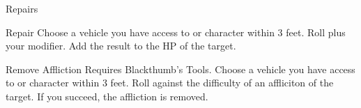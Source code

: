 \begin{abstractsection}{Repairs}
\vspace{1ex}

\begin{describe}{Repair}
  Choose a vehicle you have access to or character within 3 feet. Roll  plus  your  modifier. Add the result to the HP of the target.
\end{describe}

\begin{describe}{Remove Affliction}
  Requires Blackthumb's Tools. Choose a vehicle you have access to or character within 3 feet. Roll  against the difficulty of an affliciton of the target.  If you succeed, the affliction is removed.
\end{describe}
\end{abstractsection}
